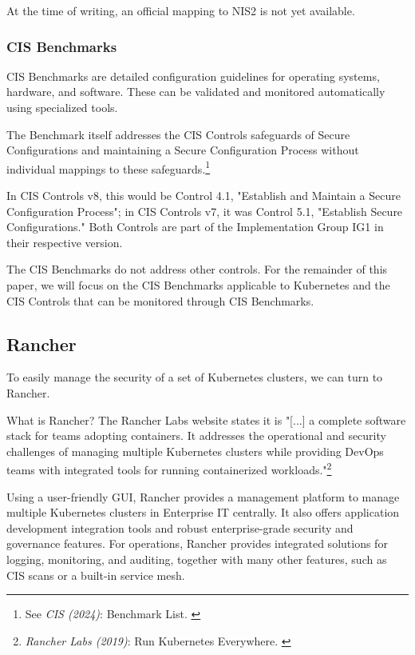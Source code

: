 At the time of writing, an official mapping to NIS2 is not yet available.

\subsubsection{CIS Benchmarks}

CIS Benchmarks are detailed configuration guidelines for operating systems, hardware, and software. These can be validated and monitored automatically using specialized tools.

The Benchmark itself addresses the CIS Controls safeguards of Secure
Configurations and maintaining a Secure Configuration Process without individual mappings to these safeguards.\footnote{See \textit{CIS (2024)}: Benchmark List. \cite{cisBenchmarks}}

In CIS Controls v8, this would be Control 4.1, "Establish and Maintain a Secure Configuration Process"; in CIS Controls v7, it was Control 5.1, "Establish Secure Configurations." Both Controls are part of the Implementation Group IG1 in their respective version.

The CIS Benchmarks do not address other controls. For the remainder of this paper, we will focus on the CIS Benchmarks applicable to Kubernetes and the CIS Controls that can be monitored through CIS Benchmarks.

\subsection{Rancher}

To easily manage the security of a set of Kubernetes clusters, we can turn to Rancher.

What is Rancher? The Rancher Labs website states it is "[...] a complete software stack for teams adopting containers. It addresses the operational and security challenges of managing multiple Kubernetes clusters while providing DevOps teams with integrated tools for running containerized workloads."\footnote{\textit{Rancher Labs (2019)}: Run Kubernetes Everywhere. \cite{rancher}}

Using a user-friendly GUI, Rancher provides a management platform to manage multiple Kubernetes clusters in Enterprise IT centrally. It also offers application development integration tools and robust enterprise-grade security and governance features. For operations, Rancher provides integrated solutions for logging, monitoring, and auditing, together with many other features, such as CIS scans or a built-in service mesh.

